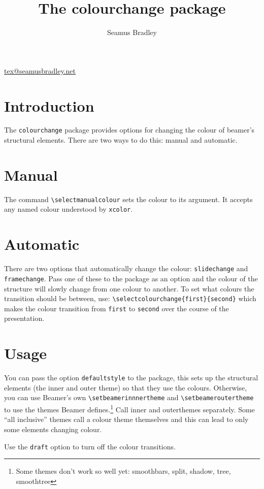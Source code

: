 \documentclass{scrartcl}
\author{Seamus Bradley}
\title{The colourchange package}
\begin{document}
\maketitle

\begin{center}
  \small \url{tex@seamusbradley.net}
\end{center}

\section{Introduction}

The \lstinline+colourchange+ package provides options for changing the colour of beamer's structural elements.
There are two ways to do this: manual and automatic.

\section{Manual}

The command \lstinline+\selectmanualcolour+ sets the colour to its argument.
It accepts any named colour understood by \lstinline+xcolor+.

\section{Automatic}

There are two options that automatically change the colour: \lstinline+slidechange+ and \lstinline+framechange+.
Pass one of these to the package as an option and the colour of the structure will slowly change from one colour to another.
To set what colours the transition should be between, use: \lstinline+\selectcolourchange{first}{second}+ which makes the colour transition from
  \lstinline+first+ to \lstinline+second+ over the course of the presentation.

\section{Usage}

You can pass the option \lstinline+defaultstyle+ to the package, this sets up the structural elements (the inner and outer theme) so that they use the colours.
Otherwise, you can use Beamer's own \lstinline+\setbeamerinnnertheme+ and \lstinline+\setbeameroutertheme+ to use the themes Beamer defines.\footnote{%
  Some themes don't work so well yet: smoothbars, split, shadow, tree, smoothtree}
Call inner and outerthemes separately.
Some ``all inclusive'' themes call a colour theme themselves and this can lead to only some elements changing colour.

Use the \lstinline+draft+ option to turn off the colour transitions.
\end{document}
